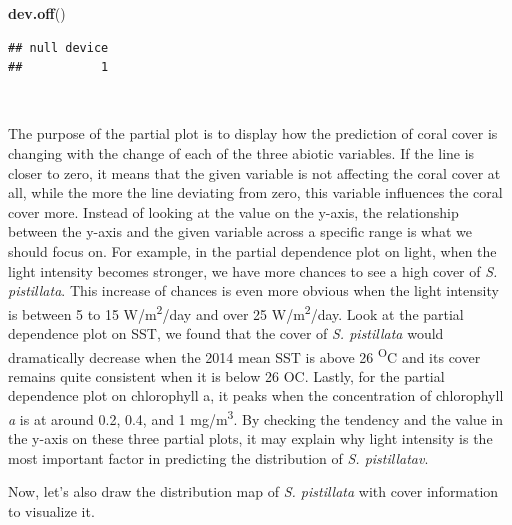 \documentclass[
]{article}
\newenvironment{Shaded}{\begin{snugshade}}{\end{snugshade}}
\newcommand{\KeywordTok}[1]{\textcolor[rgb]{0.13,0.29,0.53}{\textbf{#1}}}
\newcommand{\NormalTok}[1]{#1}
\begin{document}
\begin{Shaded}
\begin{Highlighting}[]
\KeywordTok{dev.off}\NormalTok{()}
\end{Highlighting}
\end{Shaded}

\begin{verbatim}
## null device 
##           1
\end{verbatim}

~

The purpose of the partial plot is to display how the prediction of
coral cover is changing with the change of each of the three abiotic
variables. If the line is closer to zero, it means that the given
variable is not affecting the coral cover at all, while the more the
line deviating from zero, this variable influences the coral cover more.
Instead of looking at the value on the y-axis, the relationship between
the y-axis and the given variable across a specific range is what we
should focus on. For example, in the partial dependence plot on light,
when the light intensity becomes stronger, we have more chances to see a
high cover of \emph{S. pistillata}. This increase of chances is even
more obvious when the light intensity is between 5 to 15
W/m\textsuperscript{2}/day and over 25 W/m\textsuperscript{2}/day. Look
at the partial dependence plot on SST, we found that the cover of
\emph{S. pistillata} would dramatically decrease when the 2014 mean SST
is above 26 \textsuperscript{O}C and its cover remains quite consistent
when it is below 26 OC. Lastly, for the partial dependence plot on
chlorophyll a, it peaks when the concentration of chlorophyll \emph{a}
is at around 0.2, 0.4, and 1 mg/m\textsuperscript{3}. By checking the
tendency and the value in the y-axis on these three partial plots, it
may explain why light intensity is the most important factor in
predicting the distribution of \emph{S. pistillatav}.

Now, let's also draw the distribution map of \emph{S. pistillata} with
cover information to visualize it.
\end{document}
